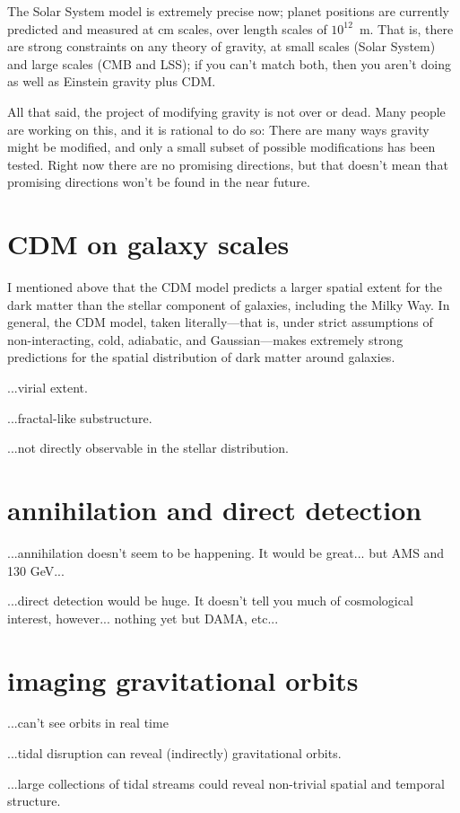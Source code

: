 \documentclass[12pt]{article}
\begin{document}
The Solar System model is extremely precise now; planet positions are
currently predicted and measured at cm scales, over length scales of
$10^12$~m.  That is, there are strong constraints on any theory of
gravity, at small scales (Solar System) and large scales (CMB and
LSS); if you can't match both, then you aren't doing as well as
Einstein gravity plus CDM.

All that said, the project of modifying gravity is not over or dead.
Many people are working on this, and it is rational to do so: There
are many ways gravity might be modified, and only a small subset of
possible modifications has been tested.  Right now there are no
promising directions, but that doesn't mean that promising directions
won't be found in the near future.

\section{CDM on galaxy scales}

I mentioned above that the CDM model predicts a larger spatial extent
for the dark matter than the stellar component of galaxies, including
the Milky Way.  In general, the CDM model, taken literally---that is,
under strict assumptions of non-interacting, cold, adiabatic, and
Gaussian---makes extremely strong predictions for the spatial
distribution of dark matter around galaxies.

...virial extent.

...fractal-like substructure.

...not directly observable in the stellar distribution.

\section{annihilation and direct detection}

...annihilation doesn't seem to be happening.  It would be
great... but AMS and 130 GeV...

...direct detection would be huge.  It doesn't tell you much of
cosmological interest, however... nothing yet but DAMA, etc...

\section{imaging gravitational orbits}

...can't see orbits in real time

...tidal disruption can reveal (indirectly) gravitational orbits.

...large collections of tidal streams could reveal non-trivial spatial
and temporal structure.
\end{document}
